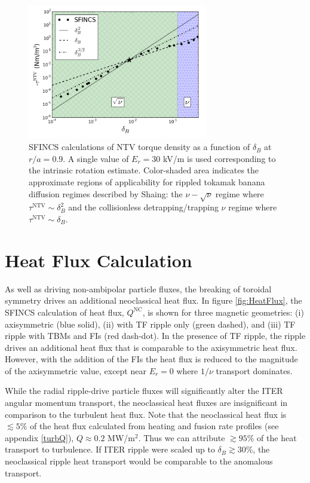 \documentclass[aip, pop, preprint]{revtex4-1}
\numberwithin{figure}{section}
\numberwithin{equation}{section}
\begin{document}
\begin{figure}[h!]
\centering
\includegraphics[width=0.7\textwidth]
{scalescan.png}
\caption{\label{fig:scalescan} SFINCS calculations of NTV torque density as a function of $\delta_B$ at $r/a = 0.9$. A single value of $E_r = 30$ kV/m is used corresponding to the intrinsic rotation estimate. Color-shaded area indicates the approximate regions of applicability for rippled tokamak banana diffusion regimes described by Shaing: the $\nu-\sqrt{\nu}$ regime where $\tau^{\text{NTV}} \sim \delta_B^2$\cite{Shaing2008} and the collisionless detrapping/trapping $\nu$ regime where $\tau^{\text{NTV}} \sim \delta_B$.\cite{Shaing2009}}
\end{figure} 

\FloatBarrier

\section{Heat Flux Calculation}\label{heatflux}
As well as driving non-ambipolar particle fluxes, the breaking of toroidal symmetry drives an additional neoclassical heat flux. In figure \ref{fig:HeatFlux}, the SFINCS calculation of heat flux, $Q^{\text{NC}}$, is shown for three magnetic geometries: (i) axisymmetric (blue solid), (ii) with TF ripple only (green dashed), and (iii) TF ripple with TBMs and FIs (red dash-dot). In the presence of TF ripple, the ripple drives an additional heat flux that is comparable to the axisymmetric heat flux. However, with the addition of the FIs the heat flux is reduced to the magnitude of the axisymmetric value, except near $E_r = 0$ where $1/\nu$ transport dominates. 

While the radial ripple-drive particle fluxes will significantly alter the ITER angular momentum transport, the neoclassical heat fluxes are insignificant in comparison to the turbulent heat flux. Note that the neoclassical heat flux is $\lesssim 5\%$  of the heat flux calculated from heating and fusion rate profiles (see appendix \ref{turbQ}), $Q\approx 0.2$ MW/m$^2$. Thus we can attribute $\gtrsim 95\%$ of the heat transport to turbulence. If ITER ripple were scaled up to $\delta_B \gtrsim 30\%$, the neoclassical ripple heat transport would be comparable to the anomalous transport.
\end{document}
